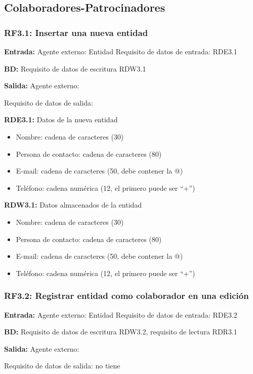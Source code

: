 \subsection{Colaboradores-Patrocinadores}
\subsubsection{RF3.1: Insertar una nueva entidad}

\textbf{Entrada:} Agente externo: Entidad         Requisito de datos de entrada: RDE3.1

\textbf{BD:} Requisito de datos de escritura RDW3.1

\textbf{Salida:} Agente externo:

Requisito de datos de salida:

\textbf{RDE3.1:} Datos de la nueva entidad
\begin{itemize}
	\item Nombre: cadena de caracteres (30)
	\item Persona de contacto: cadena de caracteres (80)
	\item E-mail: cadena de caracteres (50, debe contener la @)
	\item Teléfono: cadena numérica (12, el primero puede ser ``+'')
\end{itemize}

\textbf{RDW3.1:} Datos almacenados de la entidad
\begin{itemize}
	\item Nombre: cadena de caracteres (30)
	\item Persona de contacto: cadena de caracteres (80)
	\item E-mail: cadena de caracteres (50, debe contener la @)
	\item Teléfono: cadena numérica (12, el primero puede ser ``+'')
\end{itemize}

\subsubsection{RF3.2: Registrar entidad como colaborador en una edición}

\textbf{Entrada:} Agente externo: Entidad    Requisito de datos de entrada: RDE3.2

\textbf{BD:} Requisito de datos de escritura RDW3.2, requisito de lectura RDR3.1

\textbf{Salida:} Agente externo:

Requisito de datos de salida: no tiene

